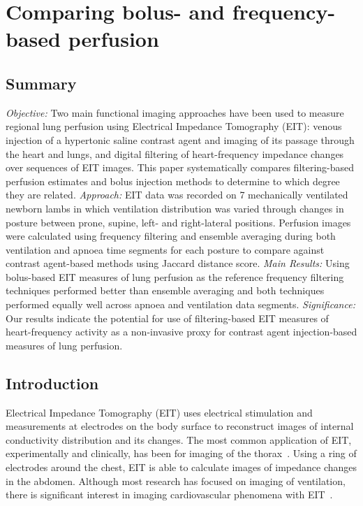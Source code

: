 \chapter{Comparing bolus- and frequency-based perfusion}
\label{chap:chapter-3}

\section{Summary}
    \emph{Objective:} Two main functional imaging approaches have been used to measure regional lung perfusion 
    using Electrical Impedance Tomography (EIT): venous injection of a hypertonic saline contrast
    agent and imaging of its passage through the heart and lungs, and digital filtering 
    of heart-frequency impedance changes over sequences of EIT images.
    This paper systematically compares filtering-based perfusion estimates and 
    bolus injection methods to determine to which degree they are related.
    \emph{Approach:} EIT data was recorded on 7 mechanically ventilated newborn lambs in which 
    ventilation distribution was varied through changes in posture
    between prone, supine, left- and right-lateral positions.
    Perfusion images were calculated using frequency filtering and ensemble averaging 
    during both ventilation and apnoea time segments for each posture to compare against 
    contrast agent-based methods using Jaccard distance score. 
    \emph{Main Results:} Using bolus-based EIT measures of lung perfusion as the reference
    frequency filtering techniques performed better than ensemble averaging
    and both techniques performed equally well across apnoea and ventilation data segments.
    \emph{Significance:} Our results indicate the potential for use of
    filtering-based EIT measures of heart-frequency activity as a non-invasive
    proxy for contrast agent injection-based measures of lung perfusion. 

\section{Introduction}

Electrical Impedance Tomography (EIT) uses electrical stimulation and measurements at electrodes on the
body surface to reconstruct images of internal conductivity
distribution and its changes.
The most common application of EIT, experimentally and clinically,
has been for imaging of the thorax~\parencite{frerichs_chest_2017}.
Using a ring of electrodes around the chest, EIT is able to calculate
images of impedance changes in the abdomen.
Although most research has focused on
imaging of ventilation, there is significant interest in imaging
cardiovascular phenomena with EIT~\parencite{adler_whither_2012,leonhardt_electrical_2012}. 

